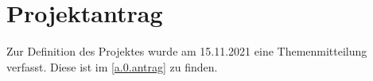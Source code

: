 
\chapter{Projektantrag} \label{0.themenmitteilung}

	Zur Definition des Projektes wurde am 15.11.2021 eine Themenmitteilung verfasst. Diese ist im \cref{a.0.antrag} zu finden.